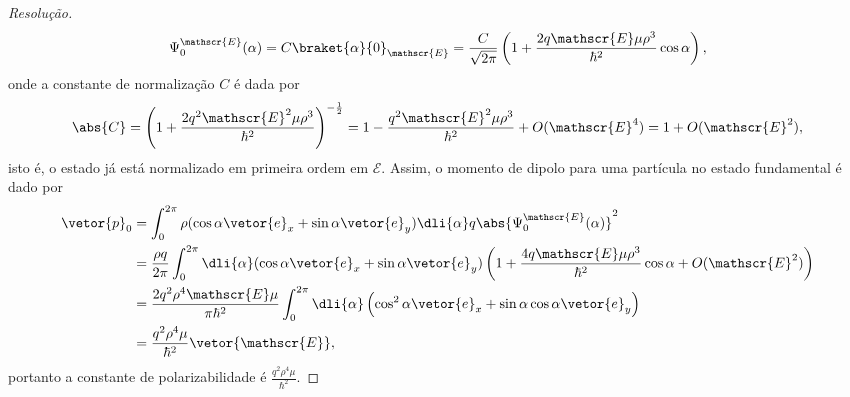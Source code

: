 \begin{proof}[Resolução]
   \begin{equation*}
      \Psi^\mathscr{E}_0(\alpha) = C\braket{\alpha}{0}_\mathscr{E} = \frac{C}{\sqrt{2\pi}}\left(1 + \frac{2q \mathscr{E} \mu \rho^3}{\hbar^2} \cos\alpha\right),
   \end{equation*}
   onde a constante de normalização \(C\) é dada por 
   \begin{equation*}
      \abs{C} = \left(1 + \frac{2q^2 \mathscr{E}^2\mu \rho^3}{\hbar^2}\right)^{-\frac12} = 1 - \frac{q^2 \mathscr{E}^2\mu\rho^3}{\hbar^2} + O(\mathscr{E}^4) = 1 + O(\mathscr{E}^2),
   \end{equation*}
   isto é, o estado já está normalizado em primeira ordem em \(\mathscr{E}.\) Assim, o momento de dipolo para uma partícula no estado fundamental é dado por
   \begin{align*}
      \vetor{p}_0 &= \int_{0}^{2\pi} \rho(\cos\alpha\vetor{e}_x + \sin\alpha \vetor{e}_y)\dli{\alpha} q\abs{\Psi_0^{\mathscr{E}}(\alpha)}^2\\
                  &= \frac{\rho q}{2\pi} \int_0^{2\pi} \dli{\alpha} (\cos\alpha\vetor{e}_x + \sin\alpha \vetor{e}_y)\left(1 + \frac{4q \mathscr{E} \mu \rho^3}{\hbar^2} \cos\alpha + O(\mathscr{E}^2)\right)\\
                  &= \frac{2q^2 \rho^4 \mathscr{E} \mu}{\pi \hbar^2}\int_0^{2\pi}\dli{\alpha}\left(\cos^2\alpha \vetor{e}_x + \sin\alpha \cos\alpha\vetor{e}_y\right)\\
                  &= \frac{q^2 \rho^4 \mu}{\hbar^2}\vetor{\mathscr{E}},
   \end{align*}
   portanto a constante de polarizabilidade é \(\frac{q^2 \rho^4 \mu}{\hbar^2}.\)


\end{proof}
